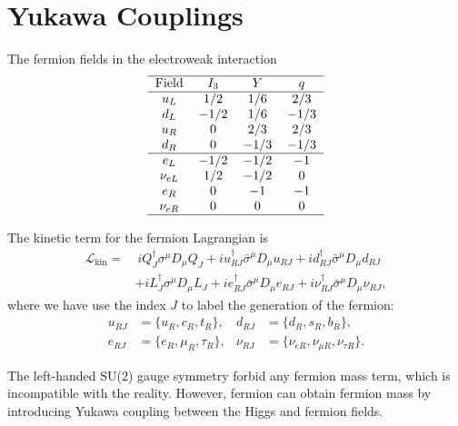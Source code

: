 \section{Yukawa Couplings}
The fermion fields in the electroweak interaction
\begin{equation}
	\begin{tabular}{c c c c}
		\hline 
		Field & $I_3$ & $Y$ & $q$\\ \hline
		$u_L$ & $1/2$ & $1/6$ & $2/3$ \\ 
		$d_L$ & $-1/2$ & $1/6$ & $-1/3$ \\  
		$u_R$ & $0$ & $2/3$ & $2/3$ \\
		$d_R$ & $0$ & $-1/3$ & $-1/3$ \\ \hline
		$e_L$ & $-1/2$ & $-1/2$ & $-1$ \\ 
		$\nu_{eL}$ & $1/2$ & $-1/2$ & $0$ \\  
		$e_R$ & $0$ & $-1$ & $-1$ \\
		$\nu_{eR}$ & $0$ & $0$ & $0$ \\
		\hline 
	\end{tabular}
\end{equation}

The kinetic term for the fermion Lagrangian is
\begin{equation}
\begin{aligned}
	\mathcal L_{\mathrm{kin}}
	=&\ i Q^\dagger_J \sigma^\mu D_\mu Q_J + i u_{RJ}^\dagger \bar\sigma^\mu D_\mu u_{RJ} + i d_{RJ}^\dagger \bar\sigma^\mu D_\mu d_{RJ} \\
	& + i L^\dagger_J \sigma^\mu D_\mu L_J + i e_{RJ}^\dagger \bar\sigma^\mu D_\mu e_{RJ} + i \nu_{RJ}^\dagger \bar\sigma^\mu D_\mu \nu_{RJ},
\end{aligned}
\end{equation}
where we have use the index $J$ to label the generation of the fermion:
\begin{equation}
\begin{aligned}
	u_{RJ} &= \{u_R, c_R, t_R\}, & 
	d_{RJ} &= \{d_R, s_R, b_R\}, \\
	e_{RJ} &= \{e_R, \mu_R, \tau_R\}, &
	\nu_{RJ} &= \{\nu_{eR},\nu_{\mu R},\nu_{\tau R}\}.
\end{aligned}
\end{equation}

The left-handed SU(2) gauge symmetry forbid any fermion mass term, which is incompatible with the reality.
However, fermion can obtain fermion mass by introducing Yukawa coupling between the Higgs and fermion fields.

